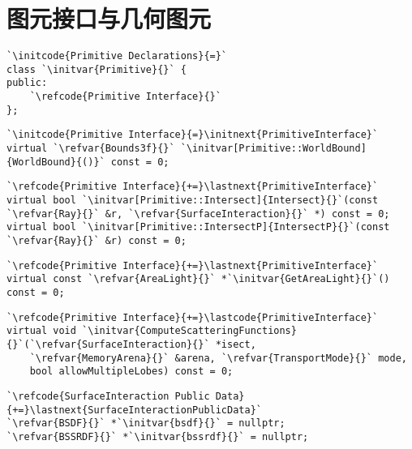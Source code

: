 \section{图元接口与几何图元}\label{sec:图元接口与几何图元}

\begin{lstlisting}
`\initcode{Primitive Declarations}{=}`
class `\initvar{Primitive}{}` {
public:
    `\refcode{Primitive Interface}{}`
};
\end{lstlisting}

\begin{lstlisting}
`\initcode{Primitive Interface}{=}\initnext{PrimitiveInterface}`
virtual `\refvar{Bounds3f}{}` `\initvar[Primitive::WorldBound]{WorldBound}{()}` const = 0;
\end{lstlisting}

\begin{lstlisting}
`\refcode{Primitive Interface}{+=}\lastnext{PrimitiveInterface}`
virtual bool `\initvar[Primitive::Intersect]{Intersect}{}`(const `\refvar{Ray}{}` &r, `\refvar{SurfaceInteraction}{}` *) const = 0;
virtual bool `\initvar[Primitive::IntersectP]{IntersectP}{}`(const `\refvar{Ray}{}` &r) const = 0;
\end{lstlisting}

\begin{lstlisting}
`\refcode{Primitive Interface}{+=}\lastnext{PrimitiveInterface}`
virtual const `\refvar{AreaLight}{}` *`\initvar{GetAreaLight}{}`() const = 0;
\end{lstlisting}

\begin{lstlisting}
`\refcode{Primitive Interface}{+=}\lastcode{PrimitiveInterface}`
virtual void `\initvar{ComputeScatteringFunctions}{}`(`\refvar{SurfaceInteraction}{}` *isect,
    `\refvar{MemoryArena}{}` &arena, `\refvar{TransportMode}{}` mode,
    bool allowMultipleLobes) const = 0;
\end{lstlisting}

\begin{lstlisting}
`\refcode{SurfaceInteraction Public Data}{+=}\lastnext{SurfaceInteractionPublicData}`
`\refvar{BSDF}{}` *`\initvar{bsdf}{}` = nullptr;
`\refvar{BSSRDF}{}` *`\initvar{bssrdf}{}` = nullptr;
\end{lstlisting}